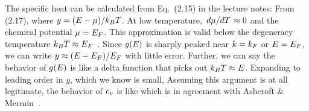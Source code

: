 {	The specific heat can be calculated from Eq.~(2.15) in the lecture notes:
	From (2.17),
	where $y = (E - \mu) / k_B T$.  At low temperature, $\dv*{\mu}{T} \approx 0$ and the chemical potential $\mu = E_F$.  This approximation is valid below the degeneracy temperature $k_B T \approx E_F$~\cite[pp.~167--168]{Landau}.  Since $g(E)$ is sharply peaked near $k = k_F$ or $E = E_F$, we can write $y \approx (E - E_F) / E_F$ with little error.  Further, we can say the behavior of $g(E)$ is like a delta function that picks out $k_B T \approx E$.  Expanding to leading order in $y$, which we know is small,
	Assuming this argument is at all legitimate, the behavior of $c_v$ is like
	which is in agreement with Ashcroft \& Mermin~\cite[p.~337]{Ashcroft}.
}